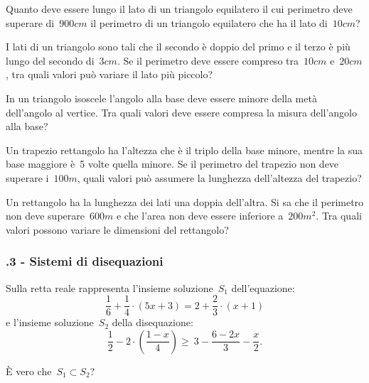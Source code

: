 \begin{multicols}{2}
 \begin{esercizio}[\Ast]
 \label{ese:21.28}
 Quanto deve essere lungo il lato di un triangolo equilatero il cui
perimetro deve superare di~$900\unit{cm}$ il perimetro di un triangolo
equilatero che ha il lato di~$10\unit{cm}$?
 \end{esercizio}

 \begin{esercizio}[\Ast]
 \label{ese:21.29}
 I lati di un triangolo sono tali che il secondo è doppio del primo e
il terzo è più lungo del secondo di~$3\unit{cm}$. Se il perimetro deve
essere compreso tra~$10\unit{cm}$ e~$20\unit{cm}$, tra quali valori può variare il lato
più piccolo?
 \end{esercizio}

 \begin{esercizio}[\Ast]
 \label{ese:21.30}
 In un triangolo isoscele l'angolo
alla base deve essere minore della metà dell'angolo
al vertice. Tra quali valori deve essere compresa la misura
dell'angolo alla base?
 \end{esercizio}

 \begin{esercizio}[\Ast]
 \label{ese:21.31}
 Un trapezio rettangolo ha l'altezza che è il triplo
della base minore, mentre la sua base maggiore è~5 volte quella minore.
Se il perimetro del trapezio non deve superare i~$100\unit{m}$, quali valori
può assumere la lunghezza dell'altezza del
trapezio?
 \end{esercizio}

 \begin{esercizio}[\Ast]
 \label{ese:21.32}
 Un rettangolo ha la lunghezza dei lati una doppia dell'altra.
Si sa che il perimetro non deve superare~$600\unit{m}$ e che
l'area non deve essere inferiore a~$200\unit{m^2}$. Tra quali
valori possono variare le dimensioni del rettangolo?
 \end{esercizio}
\end{multicols}

 \subsubsection*{\thechapter.3 - Sistemi di disequazioni}

\begin{esercizio}
 \label{ese:21.33}
Sulla retta reale rappresenta l'insieme soluzione~$S_{1}$
dell'equazione:
\[\frac{1}{6}+\frac{1}{4}\cdot (5x+3)=2+\frac{2}{3}\cdot (x+1)\]
e l'insieme soluzione~$S_{2}$ della disequazione:
\[\frac{1}{2}-2\cdot\left(\frac{1-x}{4}\right)\ge~3-\frac{6-2x}{3}-\frac{x}{2}.\]

È vero che~$S_{1}\subset S_{2}$?
\end{esercizio}

